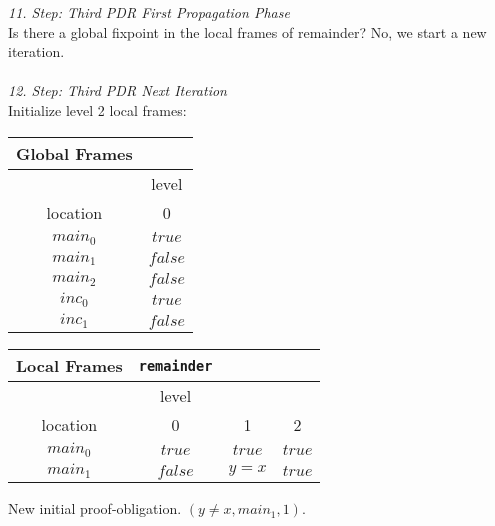 \documentclass{article}
\begin{document}
	\textsl{11. Step: Third PDR First Propagation Phase} \\
	Is there a global fixpoint in the local frames of remainder? No, we start a new iteration. \\ \\
	
	\textsl{12. Step: Third PDR Next Iteration} \\
	Initialize level 2 local frames:
	
			\begin{minipage}{.4\textwidth}
		\setlength\tabcolsep{0.35em}
		\begin{center}
			\begin{tabu}{cc}
				Global Frames \\
				\toprule
				& level \\
				\cmidrule(lr){2-2}
				location & 0 \\
				$main_0$ & $true$ \\
				$main_1$ & $false$ \\
				$main_2$ & $false$ \\
				$inc_0$ & $true$ \\
				$inc_1$ & $false$\\
				\bottomrule
			\end{tabu}
		\end{center}
	\end{minipage}
	\hfill
	\begin{minipage}{.5\textwidth}
		\setlength\tabcolsep{0.35em}
		\begin{center}
			\begin{tabu}{cccc}
				Local Frames & \texttt{remainder}\\
				\toprule
				& level \\
				\cmidrule(lr){2-4}
				location & 0 & 1 & 2 \\
				\cmidrule{1-4}
				$main_0$ & $true$ & $true$ & $true$ \\
				$main_1$ & $false$ & $y = x$ & $true$\\
				\bottomrule
			\end{tabu}
		\end{center}	
	\end{minipage}
	
	\vspace*{1em}
	New initial proof-obligation. $(y \neq x, main_1, 1)$. \\ \\
	
\end{document}
